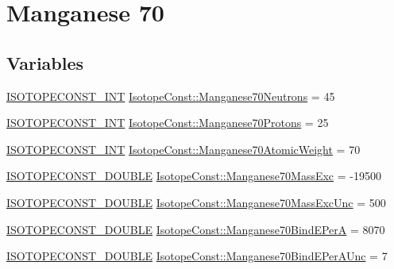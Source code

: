 \hypertarget{group___isotope_const-_manganese-_mn70}{}\section{Manganese 70}
\label{group___isotope_const-_manganese-_mn70}
\subsection*{Variables}
\begin{DoxyCompactItemize}
\item 
\mbox{\hyperlink{group___isotope_const-_macros_ga5f18360b3e99483a35c32d789e62621c}{I\+S\+O\+T\+O\+P\+E\+C\+O\+N\+S\+T\+\_\+\+I\+NT}} \mbox{\hyperlink{group___isotope_const-_manganese-_mn70_gae1951fb9f5a34fa525a0959b9c404e7b}{Isotope\+Const\+::\+Manganese70\+Neutrons}} = 45
\item 
\mbox{\hyperlink{group___isotope_const-_macros_ga5f18360b3e99483a35c32d789e62621c}{I\+S\+O\+T\+O\+P\+E\+C\+O\+N\+S\+T\+\_\+\+I\+NT}} \mbox{\hyperlink{group___isotope_const-_manganese-_mn70_ga5a5fa29f468de710ff3971e7ee89c516}{Isotope\+Const\+::\+Manganese70\+Protons}} = 25
\item 
\mbox{\hyperlink{group___isotope_const-_macros_ga5f18360b3e99483a35c32d789e62621c}{I\+S\+O\+T\+O\+P\+E\+C\+O\+N\+S\+T\+\_\+\+I\+NT}} \mbox{\hyperlink{group___isotope_const-_manganese-_mn70_ga61c786891685691be8194229265f90c8}{Isotope\+Const\+::\+Manganese70\+Atomic\+Weight}} = 70
\item 
\mbox{\hyperlink{group___isotope_const-_macros_ga8f45a7272ce02c0b4c65c44636ed719a}{I\+S\+O\+T\+O\+P\+E\+C\+O\+N\+S\+T\+\_\+\+D\+O\+U\+B\+LE}} \mbox{\hyperlink{group___isotope_const-_manganese-_mn70_ga5b114caaa3af30d5a571ec4d2749c8ff}{Isotope\+Const\+::\+Manganese70\+Mass\+Exc}} = -\/19500
\item 
\mbox{\hyperlink{group___isotope_const-_macros_ga8f45a7272ce02c0b4c65c44636ed719a}{I\+S\+O\+T\+O\+P\+E\+C\+O\+N\+S\+T\+\_\+\+D\+O\+U\+B\+LE}} \mbox{\hyperlink{group___isotope_const-_manganese-_mn70_gab768cffa43d153b3b45bc6aad781786b}{Isotope\+Const\+::\+Manganese70\+Mass\+Exc\+Unc}} = 500
\item 
\mbox{\hyperlink{group___isotope_const-_macros_ga8f45a7272ce02c0b4c65c44636ed719a}{I\+S\+O\+T\+O\+P\+E\+C\+O\+N\+S\+T\+\_\+\+D\+O\+U\+B\+LE}} \mbox{\hyperlink{group___isotope_const-_manganese-_mn70_ga22fd72b15846ac7aa1b51e47caff60bb}{Isotope\+Const\+::\+Manganese70\+Bind\+E\+PerA}} = 8070
\item 
\mbox{\hyperlink{group___isotope_const-_macros_ga8f45a7272ce02c0b4c65c44636ed719a}{I\+S\+O\+T\+O\+P\+E\+C\+O\+N\+S\+T\+\_\+\+D\+O\+U\+B\+LE}} \mbox{\hyperlink{group___isotope_const-_manganese-_mn70_ga7be0698a121cdd249326e70e09ba2e37}{Isotope\+Const\+::\+Manganese70\+Bind\+E\+Per\+A\+Unc}} = 7

\end{DoxyCompactItemize}
